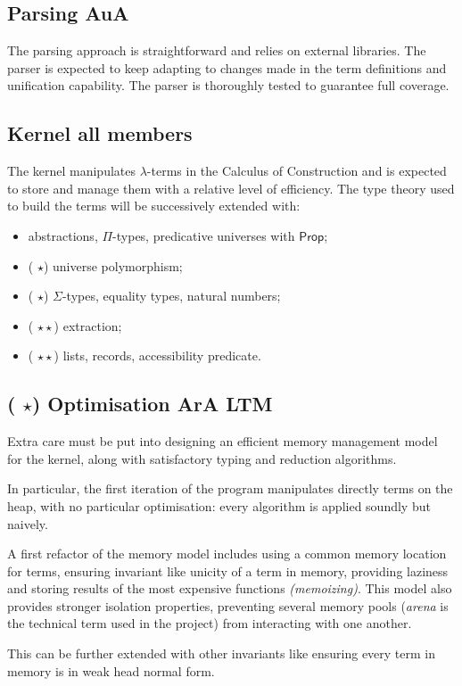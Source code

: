 \documentclass[twocolumn]{article}
\newcommand{\members}[1]{\texorpdfstring{\hfill\scriptsize #1}{}}
\newcommand{\etun}{({\color{Green} $\star$}) }
\newcommand{\etde}{({\color{Orange} $\star\star$}) }
\begin{document}
\subsection{Parsing \members{AuA}}
The parsing approach is straightforward and
relies on external libraries. The parser is expected to keep adapting to changes
made in the term definitions and unification capability. The parser is
thoroughly tested to guarantee full coverage.


\subsection{Kernel \members{all members}}
The kernel manipulates
\(\lambda\)-terms in the Calculus of Construction and is expected to store and
manage them with a relative level of efficiency. The type theory used to build
the terms will be successively extended with:
\begin{itemize}
  \item abstractions, \(\Pi\)-types, predicative universes with \(\mathsf{Prop}\);
  \item \etun universe polymorphism;
  \item \etun \(\Sigma\)-types, equality types, natural numbers;
  \item \etde extraction;
  \item \etde lists, records, accessibility predicate.
\end{itemize}


\subsection{\etun Optimisation \members{ArA LTM}}
Extra care must be put into
designing an efficient memory management model for the kernel, along with
satisfactory typing and reduction algorithms.

In particular, the first iteration of the program manipulates directly terms on
the heap, with no particular optimisation: every algorithm is applied soundly
but naively.

A first refactor of the memory model includes using a common memory location for
terms, ensuring invariant like unicity of a term in memory, providing laziness
and storing results of the most expensive functions \emph{(memoizing)}. This
model also provides stronger isolation properties, preventing several memory
pools (\emph{arena} is the technical term used in the project) from interacting
with one another.

This can be further extended with other invariants like ensuring every term in
memory is in weak head normal form.
\end{document}
